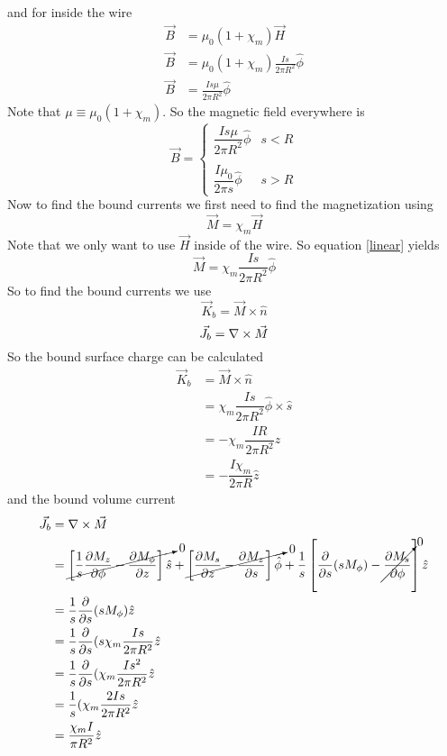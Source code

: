 \documentclass[11pt]{article}
\numberwithin{equation}{section}
\newcommand{\grad}{\bold\nabla}
\begin{document}
and for inside the wire
\begin{align*}
\vec{B} &= \mu_0(1+\chi_m)\vec{H}\\
\vec{B} &= \mu_0(1+\chi_m)\frac{Is}{2\pi R^2}\hat{\phi}\\
\vec{B} &= \frac{Is\mu}{2\pi R^2}\hat{\phi}
\end{align*}
Note that $\mu\equiv\mu_0(1+\chi_m)$.
So the magnetic field everywhere is
$$\vec{B} = \left\{\begin{array}{lc}
	\dfrac{Is\mu}{2\pi R^2}\hat{\phi}	&s<R\\
\\
 	\dfrac{I\mu_0}{2\pi s}\hat{\phi}	&s>R
		\end{array}\right.$$
Now to find the bound currents we first need to find the magnetization using
\begin{equation}
\vec{M} = \chi_m \vec{H}
\label{linear}
\end{equation}
Note that we only want to use $\vec{H}$ inside of the wire. So equation \ref{linear} yields
$$\vec{M} = \chi_m\dfrac{Is}{2\pi R^2}\hat{\phi}$$
So to find the bound currents we use
\begin{equation}
\vec{K}_b = \vec{M}\times\hat{n}
\label{Kbound}
\end{equation}
\begin{equation}
\vec{J}_b = \grad\times\vec{M}
\label{Jbound}
\end{equation}
So the bound surface charge can be calculated 
\begin{align*}
\vec{K}_b &= \vec{M}\times\hat{n}\\
&= \chi_m\dfrac{Is}{2\pi R^2}\hat{\phi}\times\hat{s}\\
&= -\chi_m\dfrac{IR}{2\pi R^2}\hat{z}\\
&= -\dfrac{I\chi_m}{2\pi R}\hat{z}
\end{align*}
and the bound volume current
\begin{align*}
\vec{J}_b &= \grad\times\vec{M}\\
&= \cancelto{0}{\left[\frac{1}{s}\frac{\partial M_z}{\partial\phi} - \frac{\partial M_{\phi}}{\partial z}\right]\hat{s}} + \cancelto{0}{\left[\frac{\partial M_s}{\partial z} - \frac{\partial M_{z}}{\partial s}\right]\hat{\phi}} + \frac{1}{s}\left[\frac{\partial}{\partial s}(sM_{\phi}) - \cancelto{0}{\frac{\partial M_s}{\partial\phi}}\right]\hat{z}\\
&= \frac{1}{s}\frac{\partial}{\partial s}(sM_{\phi})\hat{z}\\
&= \frac{1}{s}\frac{\partial}{\partial s}(s\chi_m\dfrac{Is}{2\pi R^2}\hat{z}\\
&= \frac{1}{s}\frac{\partial}{\partial s}(\chi_m\dfrac{Is^2}{2\pi R^2}\hat{z}\\
&= \frac{1}{s}(\chi_m\dfrac{2Is}{2\pi R^2}\hat{z}\\
&= \dfrac{\chi_mI}{\pi R^2}\hat{z}
\end{align*}
\end{document}
